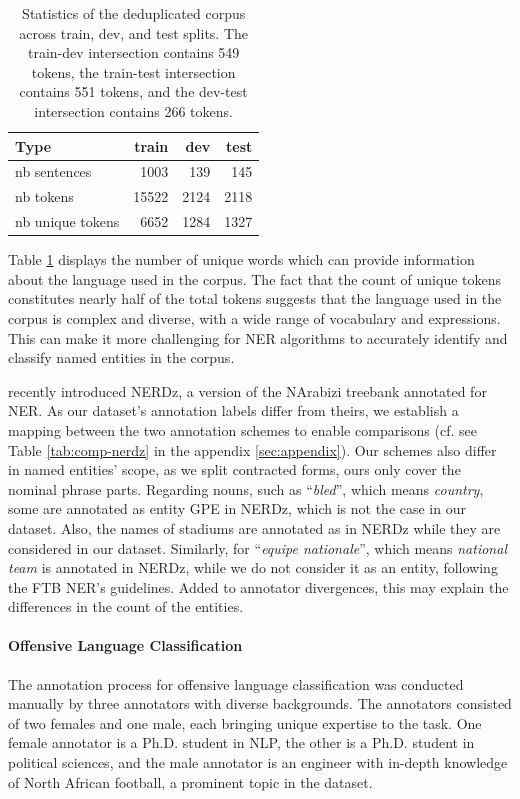 \documentclass[11pt]{article}
\newcommand{\org}{{\sc {\tt ORG}}\xspace}
\newcommand{\loc}{{\sc {\tt LOC}}\xspace}
\newcommand{\oth}{{\sc {\tt OTH}}\xspace}
\begin{document}
\begin{table}[!h]
    \centering
    \footnotesize
    \begin{tabular}{lrrr}
    \toprule
    Type &   train & dev & test  \\
    \midrule
    nb sentences  & 1003 & 139 & 145\\
    nb tokens  &  15522  &  2124 & 2118 \\
    nb unique tokens  &  6652 & 1284  & 1327 \\
    \bottomrule
    \end{tabular}
    \caption{Statistics of the deduplicated corpus across train, dev,
and test splits. The train-dev intersection contains 549 tokens, the train-test intersection contains 551 tokens, and the dev-test intersection contains 266 tokens.}
    \label{tab:stats-corpus}
\end{table}
Table \ref{tab:stats-corpus} displays the number of unique words which can provide information about the language used in the corpus. The fact that the count of unique tokens constitutes nearly half of the total tokens suggests that the language used in the corpus is complex and diverse, with a wide range of vocabulary and expressions. This can make it more challenging for NER algorithms to accurately identify and classify named entities in the corpus.

\citet{touileb2022nerdz} recently introduced NERDz, a version of the NArabizi treebank annotated for NER. As our dataset's annotation labels differ from theirs, we establish a mapping between the two annotation schemes to enable comparisons (cf. see Table \ref{tab:comp-nerdz} in the appendix \ref{sec:appendix}). Our schemes also differ in named entities' scope, as we split contracted forms, ours only cover the nominal phrase parts. Regarding nouns, such as ``\textit{bled}'', which means {\em country}, some are annotated as entity GPE in NERDz, which is not the case in our dataset. Also, the names of stadiums are annotated as \loc in NERDz while they are considered \oth in our dataset. Similarly, for ``\textit{equipe nationale}'', which means {\em national team} is annotated \org in NERDz, while we do not consider it as an entity, following the FTB NER's guidelines. Added to annotator divergences, this may explain the differences in the count of the entities.


\paragraph{Offensive Language Classification}
The annotation process for offensive language classification was conducted manually by three annotators with diverse backgrounds. The annotators consisted of two females and one male, each bringing unique expertise to the task. One female annotator is a Ph.D. student in NLP, the other is a Ph.D. student in political sciences, and the male annotator is an engineer with in-depth knowledge of North African football, a prominent topic in the dataset.
\end{document}
